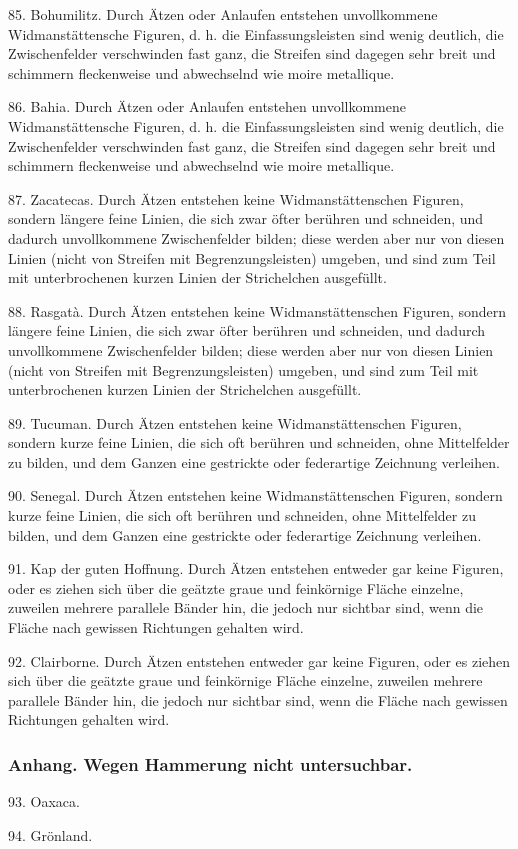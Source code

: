 \documentclass[a4paper, 11pt, oneside, polutonikogreek, german]{article}
\begin{document}
85. Bohumilitz. Durch Ätzen oder Anlaufen entstehen unvollkommene Widmanstättensche Figuren, d. h. die Einfassungsleisten sind wenig deutlich, die Zwischenfelder verschwinden fast ganz, die Streifen sind dagegen sehr breit und schimmern fleckenweise und abwechselnd wie moire metallique.

86. Bahia. Durch Ätzen oder Anlaufen entstehen unvollkommene Widmanstättensche Figuren, d. h. die Einfassungsleisten sind wenig deutlich, die Zwischenfelder verschwinden fast ganz, die Streifen sind dagegen sehr breit und schimmern fleckenweise und abwechselnd wie moire metallique.

87. Zacatecas. Durch Ätzen entstehen keine Widmanstättenschen Figuren, sondern längere feine Linien, die sich zwar öfter berühren und schneiden, und dadurch unvollkommene Zwischenfelder bilden; diese werden aber nur von diesen Linien (nicht von Streifen mit Begrenzungsleisten) umgeben, und sind zum Teil mit unterbrochenen kurzen Linien der Strichelchen ausgefüllt.

88. Rasgatà. Durch Ätzen entstehen keine Widmanstättenschen Figuren, sondern längere feine Linien, die sich zwar öfter berühren und schneiden, und dadurch unvollkommene Zwischenfelder bilden; diese werden aber nur von diesen Linien (nicht von Streifen mit Begrenzungsleisten) umgeben, und sind zum Teil mit unterbrochenen kurzen Linien der Strichelchen ausgefüllt.

89. Tucuman. Durch Ätzen entstehen keine Widmanstättenschen Figuren, sondern kurze feine Linien, die sich oft berühren und schneiden, ohne Mittelfelder zu bilden, und dem Ganzen eine gestrickte oder federartige Zeichnung verleihen.

90. Senegal. Durch Ätzen entstehen keine Widmanstättenschen Figuren, sondern kurze feine Linien, die sich oft berühren und schneiden, ohne Mittelfelder zu bilden, und dem Ganzen eine gestrickte oder federartige Zeichnung verleihen.

91. Kap der guten Hoffnung. Durch Ätzen entstehen entweder gar keine Figuren, oder es ziehen sich über die geätzte graue und feinkörnige Fläche einzelne, zuweilen mehrere parallele Bänder hin, die jedoch nur sichtbar sind, wenn die Fläche nach gewissen Richtungen gehalten wird.

92. Clairborne. Durch Ätzen entstehen entweder gar keine Figuren, oder es ziehen sich über die geätzte graue und feinkörnige Fläche einzelne, zuweilen mehrere parallele Bänder hin, die jedoch nur sichtbar sind, wenn die Fläche nach gewissen Richtungen gehalten wird.

\subsubsection{Anhang. Wegen Hammerung nicht untersuchbar.}
\hspace*{6mm}93. Oaxaca.

94. Grönland.
\clearpage
\end{document}
